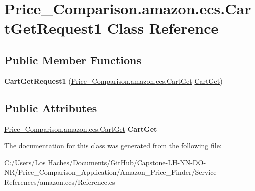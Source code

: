 \hypertarget{class_price___comparison_1_1amazon_1_1ecs_1_1_cart_get_request1}{\section{Price\-\_\-\-Comparison.\-amazon.\-ecs.\-Cart\-Get\-Request1 Class Reference}
\label{class_price___comparison_1_1amazon_1_1ecs_1_1_cart_get_request1}
}
\subsection*{Public Member Functions}
\begin{DoxyCompactItemize}
\item 
\hypertarget{class_price___comparison_1_1amazon_1_1ecs_1_1_cart_get_request1_a31d9baaecbdeb203a610adcb3d57531f}{{\bfseries Cart\-Get\-Request1} (\hyperlink{class_price___comparison_1_1amazon_1_1ecs_1_1_cart_get}{Price\-\_\-\-Comparison.\-amazon.\-ecs.\-Cart\-Get} \hyperlink{class_price___comparison_1_1amazon_1_1ecs_1_1_cart_get}{Cart\-Get})}\label{class_price___comparison_1_1amazon_1_1ecs_1_1_cart_get_request1_a31d9baaecbdeb203a610adcb3d57531f}

\end{DoxyCompactItemize}
\subsection*{Public Attributes}
\begin{DoxyCompactItemize}
\item 
\hypertarget{class_price___comparison_1_1amazon_1_1ecs_1_1_cart_get_request1_a24eb9f476490f47063b8a161f0ff3d1d}{\hyperlink{class_price___comparison_1_1amazon_1_1ecs_1_1_cart_get}{Price\-\_\-\-Comparison.\-amazon.\-ecs.\-Cart\-Get} {\bfseries Cart\-Get}}\label{class_price___comparison_1_1amazon_1_1ecs_1_1_cart_get_request1_a24eb9f476490f47063b8a161f0ff3d1d}

\end{DoxyCompactItemize}


The documentation for this class was generated from the following file\-:\begin{DoxyCompactItemize}
\item 
C\-:/\-Users/\-Los Haches/\-Documents/\-Git\-Hub/\-Capstone-\/\-L\-H-\/\-N\-N-\/\-D\-O-\/\-N\-R/\-Price\-\_\-\-Comparison\-\_\-\-Application/\-Amazon\-\_\-\-Price\-\_\-\-Finder/\-Service References/amazon.\-ecs/Reference.\-cs\end{DoxyCompactItemize}
